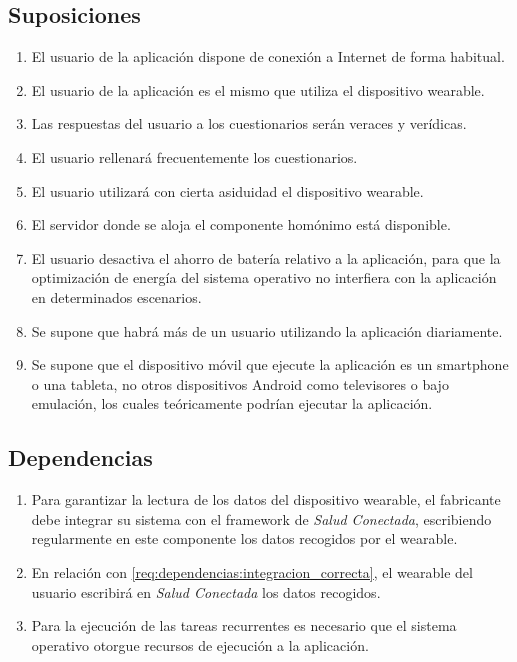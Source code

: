     \subsection{Suposiciones}
        \label{req:descripcion:suposiciones}

        \begin{enumerate}[label=\textbf{SUP-\arabic*}]
            \item El usuario de la aplicación dispone de conexión a Internet de forma habitual.
            \item El usuario de la aplicación es el mismo que utiliza el dispositivo \gls{wearable}.
            \item Las respuestas del usuario a los cuestionarios serán veraces y verídicas.
            \item El usuario rellenará frecuentemente los cuestionarios.
            \item El usuario utilizará con cierta asiduidad el dispositivo \gls{wearable}.
            \item El servidor donde se aloja el componente homónimo está disponible.
            \item El usuario desactiva el ahorro de batería relativo a la aplicación, para que la optimización de energía del sistema operativo no interfiera con la aplicación en determinados escenarios.
            \item Se supone que habrá más de un usuario utilizando la aplicación diariamente.
            \item Se supone que el dispositivo móvil que ejecute la aplicación es un \gls{smartphone} o una tableta, no otros dispositivos Android como televisores o bajo emulación, los cuales teóricamente podrían ejecutar la aplicación.
        \end{enumerate}
        
    \subsection{Dependencias}
        \label{req:descripcion:dependencias}
    
        \begin{enumerate}[label=\textbf{DEP-\arabic*}]
            \item \label{req:dependencias:integracion_correcta} Para garantizar la lectura de los datos del dispositivo \gls{wearable}, el fabricante debe integrar su sistema con el \gls{framework} de \textit{Salud Conectada}, escribiendo regularmente en este componente los datos recogidos por el \gls{wearable}.
            \item En relación con \ref{req:dependencias:integracion_correcta}, el \gls{wearable} del usuario escribirá en \textit{Salud Conectada} los datos recogidos.
            \item \label{req:dependencias:planificacion} Para la ejecución de las tareas recurrentes es necesario que el sistema operativo otorgue recursos de ejecución a la aplicación.
        \end{enumerate}

